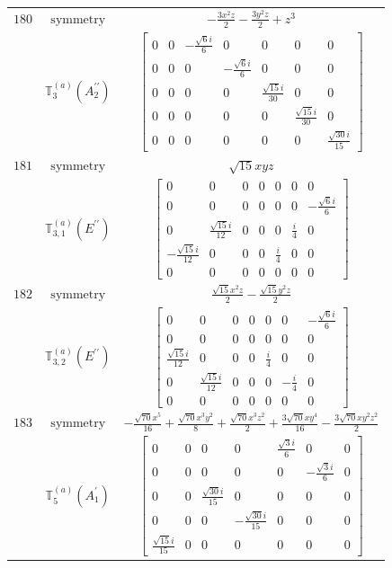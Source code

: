 \documentclass[fleqn,8pt,landscape]{jsarticle}
\begin{document}
\begin{longtable}{ccc}
$ 180 $ & $ \text{symmetry} $ & $ - \frac{3 x^{2} z}{2} - \frac{3 y^{2} z}{2} + z^{3} $ \\
$  $ & $ \mathbb{T}_{3}^{(a)}(A_{2}^{\prime\prime}) $ & $ \begin{bmatrix} 0 & 0 & - \frac{\sqrt{6} i}{6} & 0 & 0 & 0 & 0 \\ 0 & 0 & 0 & - \frac{\sqrt{6} i}{6} & 0 & 0 & 0 \\ 0 & 0 & 0 & 0 & \frac{\sqrt{15} i}{30} & 0 & 0 \\ 0 & 0 & 0 & 0 & 0 & \frac{\sqrt{15} i}{30} & 0 \\ 0 & 0 & 0 & 0 & 0 & 0 & \frac{\sqrt{30} i}{15} \end{bmatrix} $ \\ \hline
$ 181 $ & $ \text{symmetry} $ & $ \sqrt{15} x y z $ \\
$  $ & $ \mathbb{T}_{3,1}^{(a)}(E^{\prime\prime}) $ & $ \begin{bmatrix} 0 & 0 & 0 & 0 & 0 & 0 & 0 \\ 0 & 0 & 0 & 0 & 0 & 0 & - \frac{\sqrt{6} i}{6} \\ 0 & \frac{\sqrt{15} i}{12} & 0 & 0 & 0 & \frac{i}{4} & 0 \\ - \frac{\sqrt{15} i}{12} & 0 & 0 & 0 & \frac{i}{4} & 0 & 0 \\ 0 & 0 & 0 & 0 & 0 & 0 & 0 \end{bmatrix} $ \\ \hline
$ 182 $ & $ \text{symmetry} $ & $ \frac{\sqrt{15} x^{2} z}{2} - \frac{\sqrt{15} y^{2} z}{2} $ \\
$  $ & $ \mathbb{T}_{3,2}^{(a)}(E^{\prime\prime}) $ & $ \begin{bmatrix} 0 & 0 & 0 & 0 & 0 & 0 & - \frac{\sqrt{6} i}{6} \\ 0 & 0 & 0 & 0 & 0 & 0 & 0 \\ \frac{\sqrt{15} i}{12} & 0 & 0 & 0 & \frac{i}{4} & 0 & 0 \\ 0 & \frac{\sqrt{15} i}{12} & 0 & 0 & 0 & - \frac{i}{4} & 0 \\ 0 & 0 & 0 & 0 & 0 & 0 & 0 \end{bmatrix} $ \\ \hline
$ 183 $ & $ \text{symmetry} $ & $ - \frac{\sqrt{70} x^{5}}{16} + \frac{\sqrt{70} x^{3} y^{2}}{8} + \frac{\sqrt{70} x^{3} z^{2}}{2} + \frac{3 \sqrt{70} x y^{4}}{16} - \frac{3 \sqrt{70} x y^{2} z^{2}}{2} $ \\
$  $ & $ \mathbb{T}_{5}^{(a)}(A_{1}^{\prime}) $ & $ \begin{bmatrix} 0 & 0 & 0 & 0 & \frac{\sqrt{3} i}{6} & 0 & 0 \\ 0 & 0 & 0 & 0 & 0 & - \frac{\sqrt{3} i}{6} & 0 \\ 0 & 0 & \frac{\sqrt{30} i}{15} & 0 & 0 & 0 & 0 \\ 0 & 0 & 0 & - \frac{\sqrt{30} i}{15} & 0 & 0 & 0 \\ \frac{\sqrt{15} i}{15} & 0 & 0 & 0 & 0 & 0 & 0 \end{bmatrix} $ \\ \hline

\end{longtable}
\end{document}
